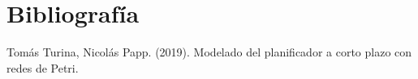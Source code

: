 \section{Bibliografía}

\begin{thebibliography}{9}
     Tomás Turina, Nicolás Papp. (2019). Modelado del planificador a corto plazo con redes de Petri.
\end{thebibliography}